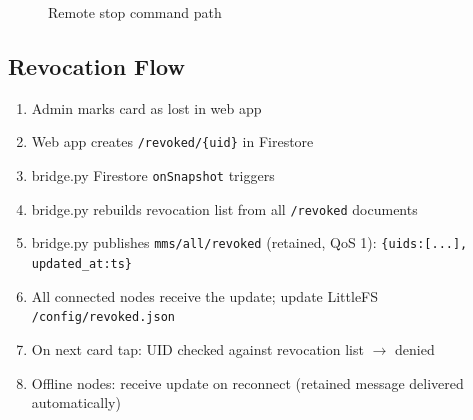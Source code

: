 \begin{figure}[H]
\centering
{}
\caption{Remote stop command path}
\label{fig:remote_stop_flow}
\end{figure}

\subsection{Revocation Flow}

\begin{enumerate}[leftmargin=1.5em]
    \item Admin marks card as lost in web app
    \item Web app creates \texttt{/revoked/\{uid\}} in Firestore
    \item bridge.py Firestore \texttt{onSnapshot} triggers
    \item bridge.py rebuilds revocation list from all \texttt{/revoked} documents
    \item bridge.py publishes \texttt{mms/all/revoked} (retained, QoS 1): \texttt{\{uids:[...], updated\_at:ts\}}
    \item All connected nodes receive the update; update LittleFS \texttt{/config/revoked.json}
    \item On next card tap: UID checked against revocation list $\rightarrow$ denied
    \item Offline nodes: receive update on reconnect (retained message delivered automatically)
\end{enumerate}

